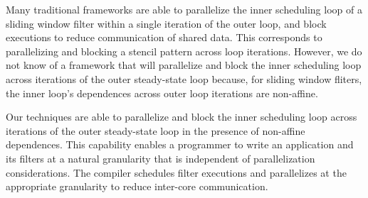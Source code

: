 Many traditional frameworks are able to parallelize the inner
scheduling loop of a sliding window filter within a single iteration
of the outer loop, and block executions to reduce communication of
shared data.  This corresponds to parallelizing and blocking a stencil
pattern across loop iterations.  However, we do not know of a
framework that will parallelize and block the inner scheduling loop
across iterations of the outer steady-state loop because, for sliding
window fliters, the inner loop's dependences across outer loop
iterations are non-affine.

Our techniques are able to parallelize and block the inner scheduling
loop across iterations of the outer steady-state loop in the presence
of non-affine dependences.  This capability enables a programmer to
write an application and its filters at a natural granularity that is 
independent of parallelization considerations.  The compiler
schedules filter executions and parallelizes at the appropriate
granularity to reduce inter-core communication.
